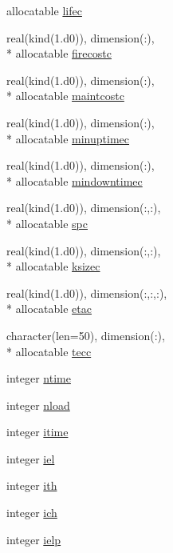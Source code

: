 \begin{DoxyCompactItemize}
allocatable \hyperlink{classinputvar_aa699a72930e1393e056fa83bd5d68df5}{lifec}
\item 
real(kind(1.d0)), dimension(\-:), \\*
allocatable \hyperlink{classinputvar_a8120efafb95065c490efb058c2a6f9a4}{firecostc}
\item 
real(kind(1.d0)), dimension(\-:), \\*
allocatable \hyperlink{classinputvar_adfa59ffad19dbf455b4964e32c3659d8}{maintcostc}
\item 
real(kind(1.d0)), dimension(\-:), \\*
allocatable \hyperlink{classinputvar_a86ea15836ba0fabd0de2d5bb9ee52cc1}{minuptimec}
\item 
real(kind(1.d0)), dimension(\-:), \\*
allocatable \hyperlink{classinputvar_a08f7d764ab0f1da8ac516b769fe8d2e4}{mindowntimec}
\item 
real(kind(1.d0)), dimension(\-:,\-:), \\*
allocatable \hyperlink{classinputvar_a16ce4ddae61b9940a768c5033f0e81a0}{spc}
\item 
real(kind(1.d0)), dimension(\-:,\-:), \\*
allocatable \hyperlink{classinputvar_a566165a1a61dae24f58f3e8e117457d4}{ksizec}
\item 
real(kind(1.d0)), dimension(\-:,\-:,\-:), \\*
allocatable \hyperlink{classinputvar_a983ea301ea452199170dcf1706f9262c}{etac}
\item 
character(len=50), dimension(\-:), \\*
allocatable \hyperlink{classinputvar_a2eb1c20cfae159c006e0fdc4b9ef0ef0}{tecc}
\item 
integer \hyperlink{classinputvar_a30d8dd7bcf1952df019939f8ad23b6e2}{ntime}
\item 
integer \hyperlink{classinputvar_ac924c0b7af6a3dbae99f1a60dc9242ab}{nload}
\item 
integer \hyperlink{classinputvar_a06f760a3ae10a8b9834a7e0d270d1d59}{itime}
\item 
integer \hyperlink{classinputvar_a6f9a3a8beea8f6e1aa8140bab654a48f}{iel}
\item 
integer \hyperlink{classinputvar_a4bba5fd8a8c399940c4b81e4da0cc9ce}{ith}
\item 
integer \hyperlink{classinputvar_a69cdcc78492d1a96e3f02ee2915f207d}{ich}
\item 
integer \hyperlink{classinputvar_a0190bc42c3dad91d811c585952ff55f4}{ielp}
\item 

\end{DoxyCompactItemize}
